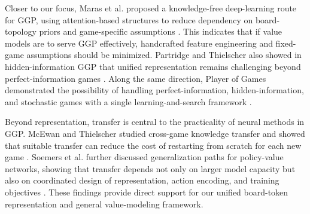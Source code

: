 
Closer to our focus, Maras et al. proposed a knowledge-free deep-learning route for GGP, using attention-based structures to reduce dependency on board-topology priors and game-specific assumptions \cite{maras2024fast}. This indicates that if value models are to serve GGP effectively, handcrafted feature engineering and fixed-game assumptions should be minimized. Partridge and Thielscher also showed in hidden-information GGP that unified representation remains challenging beyond perfect-information games \cite{partridge2022hidden}. Along the same direction, Player of Games demonstrated the possibility of handling perfect-information, hidden-information, and stochastic games with a single learning-and-search framework \cite{schmid2021player}.


Beyond representation, transfer is central to the practicality of neural methods in GGP. McEwan and Thielscher studied cross-game knowledge transfer and showed that suitable transfer can reduce the cost of restarting from scratch for each new game \cite{mcewan2022knowledge}. Soemers et al. further discussed generalization paths for policy-value networks, showing that transfer depends not only on larger model capacity but also on coordinated design of representation, action encoding, and training objectives \cite{soemers2023transfer}. These findings provide direct support for our unified board-token representation and general value-modeling framework.

